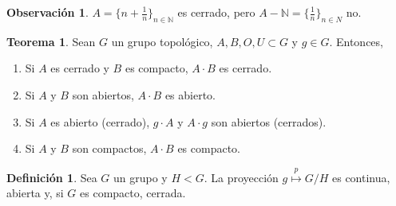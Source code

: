 \documentclass[spanish]{article}
\theoremstyle{definition}
\newtheorem*{defn}{Definición}
\newtheorem*{obs}{Observación}
\newtheorem*{teo}{Teorema}
\newcommand{\N}{\mathbb{N}}
\begin{document}
\begin{obs}
	$A=\{n+\frac{1}{n}\}_{n\in\N}$ es cerrado, pero $A-\N=\{\frac{1}{n}\}_{n\in N}$ no.
\end{obs}

\begin{teo}
	Sean $G$ un grupo topológico, $A,B,O,U\subset G$ y $g\in G$. Entonces,
	\begin{enumerate}
		\item Si $A$ es cerrado y $B$ es compacto, $A\cdot B$ es cerrado.
		\item Si $A$ y $B$ son abiertos, $A\cdot B$ es abierto.
		\item Si $A$ es abierto (cerrado), $g\cdot A$ y $A\cdot g$ son abiertos (cerrados).
		\item Si $A$ y $B$ son compactos, $A\cdot B$ es compacto.
	\end{enumerate}
\end{teo}
\begin{defn}
	Sea $G$ un grupo y $H<G$. La proyección $g\overset{p}{\mapsto}G/H$ es continua, abierta y, si $G$ es compacto, cerrada.
\end{defn}
\end{document}
